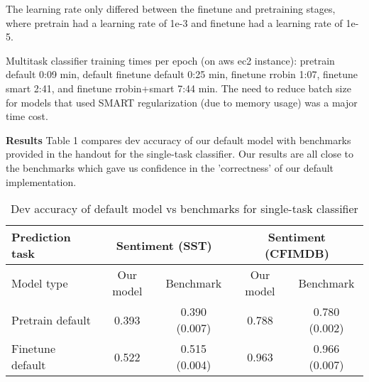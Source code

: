 \documentclass{article}
\begin{document}
The learning rate only differed between the finetune and pretraining stages, where pretrain had a learning rate of 1e-3 and finetune had a learning rate of 1e-5. 

Multitask classifier training times per epoch (on aws ec2 instance): pretrain default 0:09 min, default finetune default 0:25 min, finetune rrobin 1:07, finetune smart 2:41, and finetune rrobin+smart 7:44 min. The need to reduce batch size for models that used SMART regularization (due to memory usage) was a major time cost.


\textbf{Results}
Table 1 compares dev accuracy of our default model with benchmarks provided in the handout for the single-task classifier. Our results are all close to the benchmarks which gave us confidence in the 'correctness' of our default implementation. 
\begin{table}[h]
\centering
\begin{tabular}{|l|cc|cc|}
\hline
Prediction task  & \multicolumn{2}{c|}{Sentiment (SST)} & \multicolumn{2}{c|}{Sentiment (CFIMDB)} \\ \hline
Model type       & Our model       & Benchmark          & Our model        & Benchmark            \\ \hline
Pretrain default & 0.393           & 0.390 (0.007)      & 0.788            & 0.780 (0.002)        \\
Finetune default & 0.522           & 0.515 (0.004)      & 0.963            & 0.966 (0.007)        \\ \hline
\end{tabular}
\caption{Dev accuracy of default model vs benchmarks for single-task classifier}
\end{table}
\end{document}
